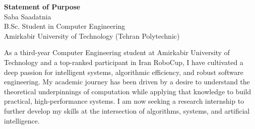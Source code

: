 \documentclass[11pt]{article}
\begin{document}
\begin{center}
    \textbf{\LARGE Statement of Purpose} \\
    \vspace{0.2em}
    \large Saba Saadatnia\\ B.Sc. Student in Computer Engineering \\ Amirkabir University of Technology (Tehran Polytechnic)
\end{center}


As a third-year Computer Engineering student at Amirkabir University of Technology and a top-ranked participant in Iran RoboCup, I have cultivated a deep passion for intelligent systems, algorithmic efficiency, and robust software engineering. My academic journey has been driven by a desire to understand the theoretical underpinnings of computation while applying that knowledge to build practical, high-performance systems. I am now seeking a research internship to further develop my skills at the intersection of algorithms, systems, and artificial intelligence.
\end{document}

